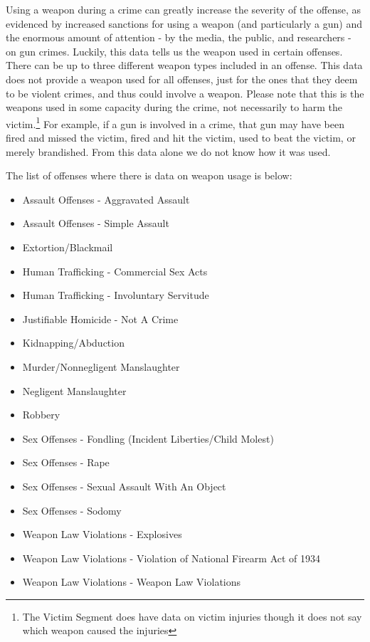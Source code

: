 \documentclass[
]{krantz}
\providecommand{\tightlist}{%
  \setlength{\itemsep}{0pt}\setlength{\parskip}{0pt}}
\begin{document}
Using a weapon during a crime can greatly increase the
severity of the offense, as evidenced by increased sanctions
for using a weapon (and particularly a gun) and the enormous
amount of attention - by the media, the public, and
researchers - on gun crimes. Luckily, this data tells us the
weapon used in certain offenses. There can be up to three
different weapon types included in an offense. This data
does not provide a weapon used for all offenses, just for
the ones that they deem to be violent crimes, and thus could
involve a weapon. Please note that this is the weapons used
in some capacity during the crime, not necessarily to harm
the victim.\footnote{The Victim Segment does have data on
  victim injuries though it does not say which weapon caused
  the injuries} For example, if a gun is involved in a
crime, that gun may have been fired and missed the victim,
fired and hit the victim, used to beat the victim, or merely
brandished. From this data alone we do not know how it was
used.

The list of offenses where there is data on weapon usage is
below:

\begin{itemize}
\tightlist
\item
  Assault Offenses - Aggravated Assault
\item
  Assault Offenses - Simple Assault
\item
  Extortion/Blackmail
\item
  Human Trafficking - Commercial Sex Acts
\item
  Human Trafficking - Involuntary Servitude
\item
  Justifiable Homicide - Not A Crime
\item
  Kidnapping/Abduction
\item
  Murder/Nonnegligent Manslaughter
\item
  Negligent Manslaughter
\item
  Robbery
\item
  Sex Offenses - Fondling (Incident Liberties/Child Molest)
\item
  Sex Offenses - Rape
\item
  Sex Offenses - Sexual Assault With An Object
\item
  Sex Offenses - Sodomy
\item
  Weapon Law Violations - Explosives
\item
  Weapon Law Violations - Violation of National Firearm Act
  of 1934
\item
  Weapon Law Violations - Weapon Law Violations
\end{itemize}
\end{document}
